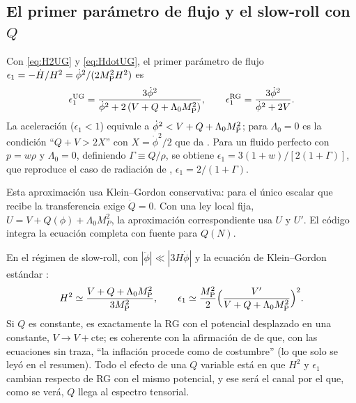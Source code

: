 \subsection{El primer parámetro de flujo y el slow-roll con $Q$}

Con \eqref{eq:H2UG} y \eqref{eq:HdotUG}, el primer parámetro de flujo $\epsilon_1=-\dot H/H^2=\dot\phi^2/(2M_{\rm P}^2H^2)$ es 
\begin{equation}
\epsilon_1^{\rm UG}=\frac{3\dot\phi^2}{\dot\phi^2+2\,(V+Q+\Lambda_0M_{\rm P}^2)},\qquad
\epsilon_1^{\rm RG}=\frac{3\dot\phi^2}{\dot\phi^2+2V}.
\label{eq:eps1UG}
\end{equation}
La aceleración ($\epsilon_1<1$) equivale a $\dot\phi^2<V+Q+\Lambda_0M_{\rm P}^2$; para $\Lambda_0=0$ es la condición ``$Q+V>2X$'' con $X=\dot\phi^2/2$ que da \cite{piccirilli23}. Para un fluido perfecto con $p=w\rho$ y $\Lambda_0=0$, definiendo $\Gamma\equiv Q/\rho$, se obtiene $\epsilon_1=3(1+w)/[2(1+\Gamma)]$, que reproduce el caso de radiación de \cite{leon22}, $\epsilon_1=2/(1+\Gamma)$.

Esta aproximación usa Klein--Gordon conservativa: para el único escalar que recibe la transferencia exige $\dot Q=0$. Con una ley local fija, $U=V+Q(\phi)+\Lambda_0 M_P^2$, la aproximación correspondiente usa $U$ y $U\prime$. El código integra la ecuación completa con fuente para $Q(N)$.

En el régimen de slow-roll, con $|\ddot\phi|\ll|3H\dot\phi|$ y la ecuación de Klein--Gordon estándar :
\begin{equation}
H^2\simeq\frac{V+Q+\Lambda_0M_{\rm P}^2}{3M_{\rm P}^2},\qquad
\epsilon_1\simeq\frac{M_{\rm P}^2}{2}\Big(\frac{V'}{V+Q+\Lambda_0M_{\rm P}^2}\Big)^2.
\label{eq:slowUG}
\end{equation}
Si $Q$ es constante, es exactamente la RG con el potencial desplazado en una constante, $V\to V+\text{cte}$; es coherente con la afirmación de \cite{ellis14} de que, con las ecuaciones sin traza, ``la inflación procede como de costumbre'' (lo que solo se leyó en el resumen). Todo el efecto de una $Q$ variable está en que $H^2$ y $\epsilon_1$ cambian respecto de RG con el mismo potencial, y ese será el canal por el que, como se verá, $Q$ llega al espectro tensorial.

